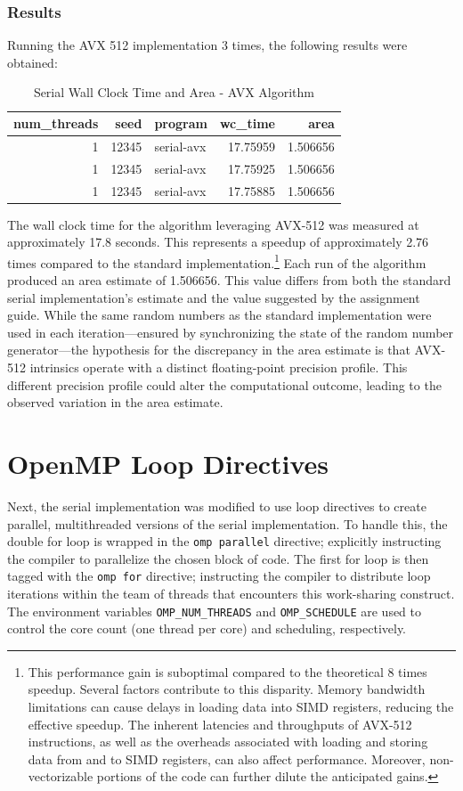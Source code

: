 \documentclass{article}
\begin{document}
\subsubsection{Results}
Running the AVX 512 implementation 3 times, the following results were obtained:
\begin{table}[H]
    \centering
    \caption{Serial Wall Clock Time and Area - AVX Algorithm}
    \fontsize{12}{14}\selectfont
    \begin{tabular}[t]{r|r|l|r|r}
    \hline
    num\_threads & seed & program & wc\_time & area\\
    \hline
    1 & 12345 & serial-avx & 17.75959 & 1.506656\\
    \hline
    1 & 12345 & serial-avx & 17.75925 & 1.506656\\
    \hline
    1 & 12345 & serial-avx & 17.75885 & 1.506656\\
    \hline
    \end{tabular}
\end{table}
\noindent The wall clock time for the algorithm leveraging AVX-512 was measured 
at approximately 17.8 seconds. This represents a speedup of approximately 2.76 times 
compared to the standard implementation.\footnote{
    This performance gain is suboptimal compared to the theoretical 8 times speedup. Several factors contribute to this disparity. 
    Memory bandwidth limitations can cause delays in loading data into SIMD registers, 
    reducing the effective speedup. The inherent latencies and throughputs of AVX-512 instructions, 
    as well as the overheads associated with loading and storing data from and to SIMD registers, can also affect performance. 
    Moreover, non-vectorizable portions of the code can further dilute the anticipated gains.
} Each 
run of the algorithm produced an area estimate of 1.506656. 
This value differs from both the standard serial implementation's estimate 
and the value suggested by the assignment guide. While the same random numbers as the standard implementation 
were used in each iteration—ensured by synchronizing the state of the random number generator—the 
hypothesis for the discrepancy in the area estimate is that AVX-512 intrinsics 
operate with a distinct floating-point precision profile. This different precision 
profile could alter the computational outcome, leading to the observed variation in the area estimate.

\section{OpenMP Loop Directives}
Next, the serial implementation was modified to use loop directives to create parallel, 
multithreaded versions of the serial implementation. To handle this, the double 
for loop is wrapped in the \texttt{omp parallel} directive; explicitly instructing 
the compiler to parallelize the chosen block of code. The first for loop is then tagged 
with the \texttt{omp for} directive; instructing the compiler to distribute loop 
iterations within the team of threads that encounters this work-sharing construct. The environment variables 
\texttt{OMP\_NUM\_THREADS} and \texttt{OMP\_SCHEDULE} are used to control the core count (one thread per core) 
and scheduling, respectively.
\end{document}
